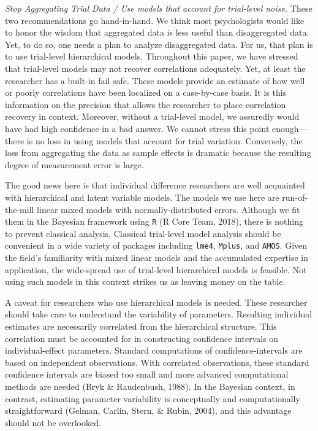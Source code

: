 \documentclass[
  english,
  ,man]{apa6}
\begin{document}
\emph{Stop Aggregating Trial Data / Use models that account for trial-level noise.} These two recommendations go hand-in-hand. We think most psychologists would like to honor the wisdom that aggregated data is less useful than disaggregated data. Yet, to do so, one needs a plan to analyze disaggregated data. For us, that plan is to use trial-level hierarchical models. Throughout this paper, we have stressed that trial-level models may not recover correlations adequately. Yet, at least the researcher has a built-in fail safe. These models provide an estimate of how well or poorly correlations have been localized on a case-by-case basis. It is this information on the precision that allows the researcher to place correlation recovery in context. Moreover, without a trial-level model, we assuredly would have had high confidence in a bad answer. We cannot stress this point enough---there is no loss in using models that account for trial variation. Conversely, the loss from aggregating the data as sample effects is dramatic because the resulting degree of measurement error is large.

The good news here is that individual difference researchers are well acquainted with hierarchical and latent variable models. The models we use here are run-of-the-mill linear mixed models with normally-distributed errors. Although we fit them in the Bayesian framework using \texttt{R} (R Core Team, 2018), there is nothing to prevent classical analysis. Classical trial-level model analysis should be convenient in a wide variety of packages including \texttt{lme4}, \texttt{Mplus}, and \texttt{AMOS}. Given the field's familiarity with mixed linear models and the accumulated expertise in application, the wide-spread use of trial-level hierarchical models is feasible. Not using such models in this context strikes us as leaving money on the table.

A caveat for researchers who use hierarchical models is needed. These researcher should take care to understand the variability of parameters. Resulting individual estimates are necessarily correlated from the hierarchical structure. This correlation must be accounted for in constructing confidence intervals on individual-effect parameters. Standard computations of confidence-intervals are based on independent observations. With correlated observations, these standard confidence intervals are biased too small and more advanced computational methods are needed (Bryk \& Raudenbush, 1988). In the Bayesian context, in contrast, estimating parameter variability is conceptually and computationally straightforward (Gelman, Carlin, Stern, \& Rubin, 2004), and this advantage should not be overlooked.
\end{document}
